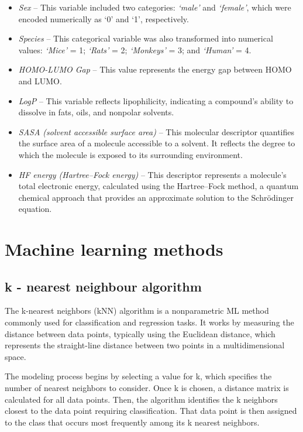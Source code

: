 \begin{itemize}
    \item \textit{Sex} – This variable included two categories: \textit{‘male’} and \textit{‘female’}, which were encoded numerically as ‘0’ and ‘1’, respectively.
    
    \item \textit{Species} – This categorical variable was also transformed into numerical values: \textit{‘Mice’} = 1; \textit{‘Rats’} = 2; \textit{‘Monkeys’} = 3; and \textit{‘Human’} = 4.

    \item \textit{HOMO-LUMO Gap} – This value represents the energy gap between HOMO and LUMO.
    
    \item \textit{LogP} – This variable reflects lipophilicity, indicating a compound’s ability to dissolve in fats, oils, and nonpolar solvents.
    
    \item \textit{SASA (solvent accessible surface area)} – This molecular descriptor quantifies the surface area of a molecule accessible to a solvent. It reflects the degree to which the molecule is exposed to its surrounding environment.
    
    \item \textit{HF energy (Hartree–Fock energy)} – This descriptor represents a molecule’s total electronic energy, calculated using the Hartree–Fock method, a quantum chemical approach that provides an approximate solution to the Schrödinger equation.
\end{itemize}


\section{Machine learning methods}


\subsection{k - nearest neighbour algorithm}

The k-nearest neighbors (kNN) algorithm is a nonparametric ML method commonly used for classification and regression tasks. It works by measuring the distance between data points, typically using the Euclidean distance, which represents the straight-line distance between two points in a multidimensional space.

The modeling process begins by selecting a value for k, which specifies the number of nearest neighbors to consider. Once k is chosen, a distance matrix is calculated for all data points. Then, the algorithm identifies the k neighbors closest to the data point requiring classification. That data point is then assigned to the class that occurs most frequently among its k nearest neighbors.

